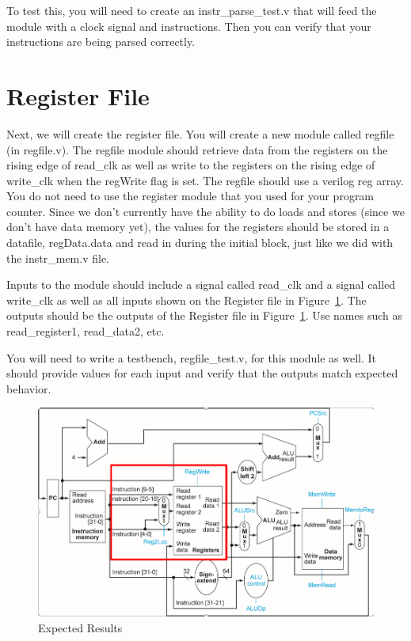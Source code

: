 To test this, you will need to create an instr\_parse\_test.v that will feed the module with a clock signal and instructions.  Then you can verify that your instructions are being parsed correctly.

\section{Register File}

Next, we will create the register file.  You will create a new module called regfile (in regfile.v).  The regfile module should retrieve data from the registers on the rising edge of read\_clk as well as write to the registers on the rising edge of write\_clk when the regWrite flag is set.  The regfile should use a verilog reg array.  You do not need to use the register module that you used for your program counter.  Since we don't currently have the ability to do loads and stores (since we don't have data memory yet), the values for the registers should be stored in a datafile, regData.data and read in during the initial block, just like we did with the instr\_mem.v file.  

Inputs to the module should include a signal called read\_clk and a signal called write\_clk as well as all inputs shown on the Register file in Figure~\ref{fig:register_file_cutout}.  The outputs should be the outputs of the Register file in Figure~\ref{fig:register_file_cutout}.  Use names such as read\_register1, read\_data2, etc.

You will need to write a testbench, regfile\_test.v, for this module as well.  It should provide values for each input and verify that the outputs match expected behavior.

\begin{figure}
	\caption{Expected Results}\label{fig:register_file_cutout}
	\begin{center}
		\includegraphics[width=4.75in]{../images/register_file_cutout.png}
	\end{center}
\end{figure} 


